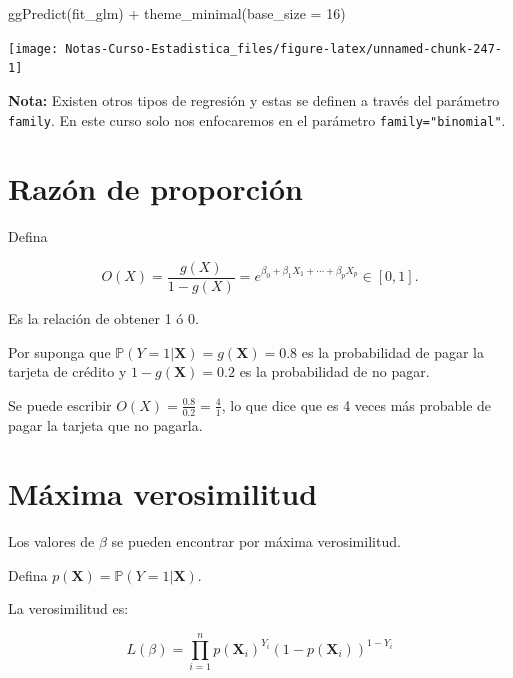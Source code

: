 \documentclass[
  12pt,
]{book}
\newenvironment{Shaded}{\begin{snugshade}}{\end{snugshade}}
\newcommand{\AttributeTok}[1]{\textcolor[rgb]{0.77,0.63,0.00}{#1}}
\newcommand{\DecValTok}[1]{\textcolor[rgb]{0.00,0.00,0.81}{#1}}
\newcommand{\FunctionTok}[1]{\textcolor[rgb]{0.00,0.00,0.00}{#1}}
\newcommand{\NormalTok}[1]{#1}
\newcommand{\SpecialCharTok}[1]{\textcolor[rgb]{0.00,0.00,0.00}{#1}}
\theoremstyle{definition}
\theoremstyle{definition}
\theoremstyle{definition}
\theoremstyle{remark}
\begin{document}
\begin{Shaded}
\begin{Highlighting}[]
\FunctionTok{ggPredict}\NormalTok{(fit\_glm) }\SpecialCharTok{+} \FunctionTok{theme\_minimal}\NormalTok{(}\AttributeTok{base\_size =} \DecValTok{16}\NormalTok{)}
\end{Highlighting}
\end{Shaded}

\begin{center}\texttt{[image: Notas-Curso-Estadistica\_files/figure-latex/unnamed-chunk-247-1]} \end{center}

\textbf{Nota:} Existen otros tipos de regresión y estas se definen a través del parámetro \texttt{family}. En este curso solo nos enfocaremos en el parámetro \texttt{family="binomial"}.

\hypertarget{razuxf3n-de-proporciuxf3n}{%
\section{Razón de proporción}\label{razuxf3n-de-proporciuxf3n}}

Defina

\begin{equation*}
O(X) = \frac{g(X)}{1-g(X)} = e^{\beta_{0} +\beta_{1} X_{1} + \cdots + \beta_{p} X_{p}} \in [0,1].
\end{equation*}

Es la relación de obtener 1 ó 0.

Por suponga que \(\mathbb{P}\left(Y=1\vert \boldsymbol{X}\right) = g(\boldsymbol{X}) = 0.8\) es la probabilidad de pagar la tarjeta de crédito y \(1-g(\boldsymbol{X}) = 0.2\) es la probabilidad de no pagar.

Se puede escribir \(O(X) = \frac{0.8}{0.2} = \frac{4}{1}\), lo que dice que es 4 veces más probable de pagar la tarjeta que no pagarla.

\hypertarget{muxe1xima-verosimilitud}{%
\section{Máxima verosimilitud}\label{muxe1xima-verosimilitud}}

Los valores de \(\beta\) se pueden encontrar por máxima verosimilitud.

Defina \(p(\boldsymbol{X}) = \mathbb{P}\left(Y=1\vert \boldsymbol{X}\right)\).

La verosimilitud es:

\[
L\left(\beta\right)=\prod_{i=1}^{n} p\left(\boldsymbol{X}_{i}\right)^{Y_{i}}\left(1-p\left(\boldsymbol{X}_{i}\right)\right)^{1-Y_{i}}
\]
\end{document}
